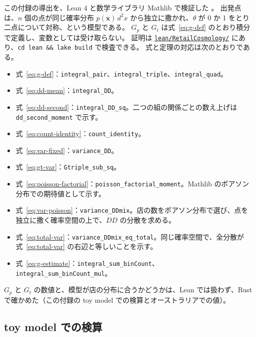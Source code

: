 \documentclass[a4paper,11pt]{ltjsarticle}
\newcommand{\repourl}{https://github.com/inuverse44/retail-cosmology}
\newcommand{\code}[1]{\textcolor{codecolor}{\texttt{#1}}}
\begin{document}
この付録の導出を、Lean 4 と数学ライブラリ Mathlib で検証した \cite{Mathlib2020}。
出発点は、$n$ 個の点が同じ確率分布 $p(\bm{x})\, d^2x$ から独立に撒かれ、$\theta$ が 0 か 1 をとり二点について対称、という模型である。
$G_p$ と $G_t$ は式~\eqref{eq:g-def} のとおり積分で定義し、変数としては受け取らない。
証明は \href{\repourl/tree/main/lean/RetailCosmology}{\nolinkurl{lean/RetailCosmology/}} にあり、\code{cd lean \&\& lake build} で検査できる。
式と定理の対応は次のとおりである。
\begin{itemize}
  \item 式~\eqref{eq:g-def}：\code{integral\_pair}、\code{integral\_triple}、\code{integral\_quad}。
  \item 式~\eqref{eq:dd-mean}：\code{integral\_DD}。
  \item 式~\eqref{eq:dd-second}：\code{integral\_DD\_sq}。二つの組の関係ごとの数え上げは \code{dd\_second\_moment} で示す。
  \item 式~\eqref{eq:count-identity}：\code{count\_identity}。
  \item 式~\eqref{eq:var-fixed}：\code{variance\_DD}。
  \item 式~\eqref{eq:gt-var}：\code{Gtriple\_sub\_sq}。
  \item 式~\eqref{eq:poisson-factorial}：\code{poisson\_factorial\_moment}。Mathlib のポアソン分布での期待値として示す。
  \item 式~\eqref{eq:var-poisson}：\code{variance\_DDmix}。店の数をポアソン分布で選び、点を独立に撒く確率空間の上で、$DD$ の分散を求める。
  \item 式~\eqref{eq:total-var}：\code{variance\_DDmix\_eq\_total}。同じ確率空間で、全分散が式~\eqref{eq:total-var} の右辺と等しいことを示す。
  \item 式~\eqref{eq:g-estimate}：\code{integral\_sum\_binCount}、\code{integral\_sum\_binCount\_mul}。
\end{itemize}
$G_p$ と $G_t$ の数値と、模型が店の分布に合うかどうかは、Lean では扱わず、Rust で確かめた（この付録の toy model での検算とオーストラリアでの値）。

\subsection{toy model での検算}
\end{document}
